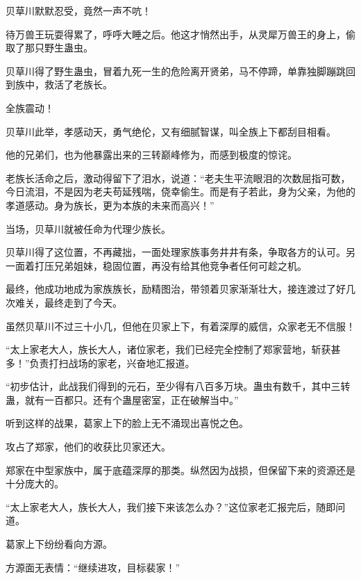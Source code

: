 \begin{this_body}
贝草川默默忍受，竟然一声不吭！

待万兽王玩耍得累了，呼呼大睡之后。他这才悄然出手，从灵犀万兽王的身上，偷取了那只野生蛊虫。

贝草川得了野生蛊虫，冒着九死一生的危险离开贤弟，马不停蹄，单靠独脚蹦跳回到族中，救活了老族长。

全族震动！

贝草川此举，孝感动天，勇气绝伦，又有细腻智谋，叫全族上下都刮目相看。

他的兄弟们，也为他暴露出来的三转巅峰修为，而感到极度的惊诧。

老族长活命之后，激动得留下了泪水，说道：“老夫生平流眼泪的次数屈指可数，今日流泪，不是因为老夫苟延残喘，侥幸偷生。而是有子若此，身为父亲，为他的孝道感动。身为族长，更为本族的未来而高兴！”

当场，贝草川就被任命为代理少族长。

贝草川得了这位置，不再藏拙，一面处理家族事务井井有条，争取各方的认可。另一面着打压兄弟姐妹，稳固位置，再没有给其他竞争者任何可趁之机。

最终，他成功地成为家族族长，励精图治，带领着贝家渐渐壮大，接连渡过了好几次难关，最终走到了今天。

虽然贝草川不过三十小几，但他在贝家上下，有着深厚的威信，众家老无不信服！

“太上家老大人，族长大人，诸位家老，我们已经完全控制了郑家营地，斩获甚多！”负责打扫战场的家老，兴奋地汇报道。

“初步估计，此战我们得到的元石，至少得有八百多万块。蛊虫有数千，其中三转蛊，就有一百都只。还有个蛊屋密室，正在破解当中。”

听到这样的战果，葛家上下的脸上无不涌现出喜悦之色。

攻占了郑家，他们的收获比贝家还大。

郑家在中型家族中，属于底蕴深厚的那类。纵然因为战损，但保留下来的资源还是十分庞大的。

“太上家老大人，族长大人，我们接下来该怎么办？”这位家老汇报完后，随即问道。

葛家上下纷纷看向方源。

方源面无表情：“继续进攻，目标裴家！”

\end{this_body}

